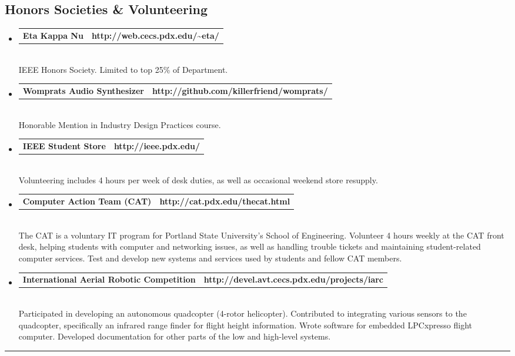 \documentclass[10pt,letterpaper]{article}
\makeatletter
\newcommand{\headerrow}[2]
{\begin{tabular*}{\linewidth}{l@{\extracolsep{\fill}}r}
	#1 &
	#2 \\
\end{tabular*}}
\makeatother
\begin{document}
\subsection*{Honors Societies \& Volunteering}
\begin{itemize}
  \item
	\headerrow
		{\textbf{Eta Kappa Nu}}
		{\textbf{http://web.cecs.pdx.edu/\textasciitilde eta/}}
	\\
  IEEE Honors Society. Limited to top 25\% of Department.

  \item
	\headerrow
		{\textbf{Womprats Audio Synthesizer}}
		{\textbf{http://github.com/killerfriend/womprats/}}
	\\
  Honorable Mention in Industry Design Practices course.
  
  \item
	\headerrow
		{\textbf{IEEE Student Store}}
		{\textbf{http://ieee.pdx.edu/}}
	\\
  Volunteering includes 4 hours per week of desk duties, as well as occasional weekend store resupply.

  \item
  \headerrow
    {\textbf{Computer Action Team (CAT)}}
		{\textbf{http://cat.pdx.edu/thecat.html}}
	\\
  The CAT is a voluntary IT program for Portland State University's School of Engineering. Volunteer 4 hours weekly at the CAT front desk, helping students with computer and networking issues, as well as handling trouble tickets and maintaining student-related computer services. Test and develop new systems and services used by students and fellow CAT members. 

  \item
  \headerrow
    {\textbf{International Aerial Robotic Competition}}
		{\textbf{http://devel.avt.cecs.pdx.edu/projects/iarc}}
	\\
  Participated in developing an autonomous quadcopter (4-rotor helicopter). Contributed to integrating various sensors to the quadcopter, specifically an infrared range finder for flight height information. Wrote software for embedded LPCxpresso flight computer. Developed documentation for other parts of the low and high-level systems.
\end{itemize}
\vspace{1em}

\hrule
\vspace{-0.4em}
\end{document}

